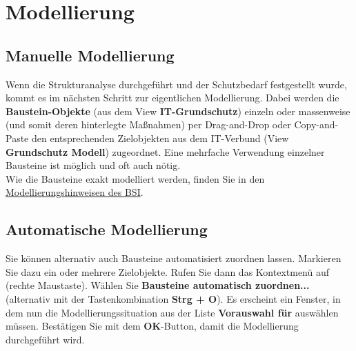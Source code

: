 \documentclass[a4paper,10pt]{book}
\begin{document}
\section{Modellierung}

\subsection{Manuelle Modellierung}
Wenn die Strukturanalyse durchgeführt und der Schutzbedarf festgestellt wurde, kommt es im nächsten Schritt zur eigentlichen
Modellierung. Dabei werden die \textbf{Baustein-Objekte} (aus dem View \textbf{IT-Grundschutz}) einzeln oder massenweise
(und somit deren hinterlegte Maßnahmen) per Drag-and-Drop oder Copy-and-Paste den entsprechenden Zielobjekten aus dem IT-Verbund
(View \textbf{Grundschutz Modell}) zugeordnet. Eine mehrfache Verwendung einzelner Bausteine ist möglich und oft auch nötig.
\newline\\
Wie die Bausteine exakt modelliert werden, finden Sie in den
\href{https://www.bsi.bund.de/ContentBSI/grundschutz/kataloge/allgemein/modellierung/02001.html}{Modellierungshinweisen des BSI}.

\subsection{Automatische Modellierung}
Sie können alternativ auch Bausteine automatisiert zuordnen lassen. Markieren Sie dazu ein oder mehrere Zielobjekte.
Rufen Sie dann das Kontextmenü auf (rechte Maustaste). Wählen Sie \textbf{Bausteine automatisch zuordnen...}
(alternativ mit der Tastenkombination \textbf{Strg + O}). Es erscheint ein Fenster, in dem nun die Modellierungssituation aus der
Liste \textbf{Vorauswahl für} auswählen müssen. Bestätigen Sie mit dem \textbf{OK}-Button, damit die Modellierung durchgeführt wird.
\end{document}
